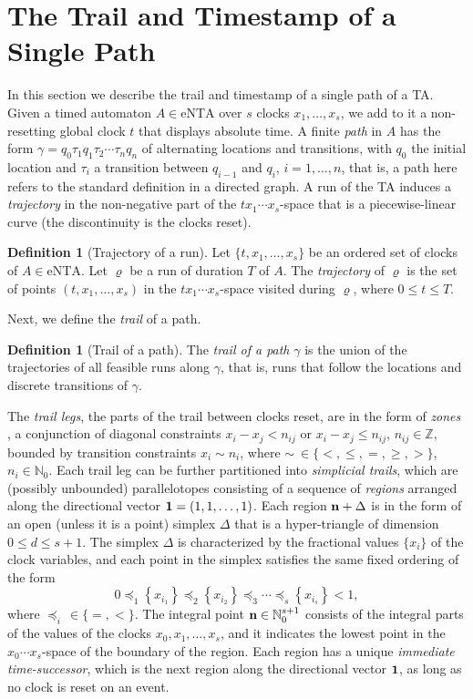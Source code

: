 \documentclass[11pt]{amsart}
\theoremstyle{definition}
\newtheorem{definition}[theorem]{Definition}
\newcommand{\ntaeps}{\mathrm{eNTA}}
\newcommand{\ZNaturals}{\mathbb{N}_0}
\newcommand{\Integers}{\mathbb{Z}}
\newcommand{\frc}[1]{\left\{{#1}\right\}}
\begin{document}
\section{The Trail and Timestamp of a Single Path}
\label{sec:sing_path}
In this section we describe the trail and timestamp of a single path of a TA.
Given a timed automaton $A \in \ntaeps$ over $s$ clocks $x_1, \ldots, x_s$, we add to it a non-resetting global clock $t$ that displays absolute time.
A finite \emph{path} in $A$ has the form $\gamma = q_0 \tau_1 q_1 \tau_2 \cdots \tau_n q_n$ of alternating locations and transitions, with $q_0$ the initial location and $\tau_i$ a transition between $q_{i-1}$ and $q_i$, $i=1,\ldots,n$, that is, a path here refers to the standard definition in a directed graph.
A run of the TA induces a \emph{trajectory} in the non-negative part of the $t x_1 \cdots x_s$-space that is a piecewise-linear curve (the discontinuity is the clocks reset).
\begin{definition}[Trajectory of a run]
	Let $\{ t, x_1, \ldots, x_s \}$ be an ordered set of clocks of $A \in \ntaeps$. 
	Let $\varrho$ be a run of duration $T$ of $A$.
	The \emph{trajectory} of $\varrho$ is the set of points $(t, x_1, \ldots, x_s)$ in the $t x_1 \cdots x_s$-space visited during $\varrho$, where $0 \leq t \leq T$.
\end{definition}
Next, we define the \emph{trail} of a path.
\begin{definition}[Trail of a path]
	The \emph{trail of a path} $\gamma$
is the union of the trajectories of all feasible runs along $\gamma$, that is, runs that follow the locations and discrete transitions of $\gamma$.
\end{definition}
The \emph{trail legs}, the parts of the trail between clocks reset, are in the form of \emph{zones} \cite{zones}, a conjunction of diagonal constraints $x_i - x_j < n_{ij}$ or $x_i - x_j \leq n_{ij}$, $n_{ij} \in \Integers$, bounded by transition constraints $x_i \sim n_i$, where $\sim \ \in \{<,\leq, =,\geq, >\}$, $n_i \in \ZNaturals$.
Each trail leg can be further partitioned into \emph{simplicial trails}, which are (possibly unbounded) parallelotopes consisting of a sequence of \emph{regions} \cite{ta} arranged along the directional vector ${\bf 1} = (1,1, \ldots, 1)$.
Each region ${\bf n} + \Delta$ is in the form of an open (unless it is a point) simplex $\Delta$ that is a hyper-triangle of dimension $0 \leq d \leq s+1$.
The simplex $\Delta$ is characterized by the fractional values $\{x_i\}$ of the clock variables, and each point in the simplex satisfies the same fixed ordering of the form
\begin{equation}
\label{eq:simplex}
0 \preceq_1 \frc{x_{i_1}} \preceq_2 \frc{x_{i_2}} \preceq_3 \cdots \preceq_s \frc{x_{i_s}} < 1,
\end{equation} 
 where $\preceq_i \, \in \{=, < \}$.
The integral point ${\bf n} \in \ZNaturals^{s+1}$ consists of the integral parts of the values of the clocks $x_0, x_1, \ldots, x_s$, and it indicates the lowest point in 
the $x_0 \cdots x_s$-space of the boundary of the region.  
Each region has a unique \emph{immediate time-successor}, which is the next region along the directional vector ${\bf 1}$, as long as no clock is reset on an event.
\end{document}
